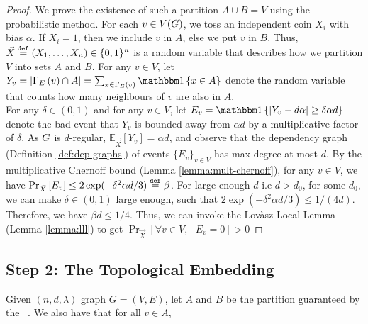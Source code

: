 \documentclass[11pt]{article}
\newcommand{\EnDeeLambda}{(n, d, \lambda)}
\newcommand{\EdgesShort}{E}
\newcommand{\Mean}[2]{\mathbb{E}_{#1}\left[#2\right]}
\newcommand{\PProb}[2]{\Pr_{#2}\left[#1 \right]}
\begin{document}
\begin{proof}We prove the existence of such a partition $A \cup B = V$ using the probabilistic method.
For each $v \in V(G)$, we toss an independent coin $X_i$ with bias $\alpha$.
If $X_i = 1$, then we include $v$ in $A$, else we put $v$ in $B$.
Thus, $\vec{X} \text{}\overset{\mathtt{def}}{=} (X_1, \dots, X_n) \in \{0,1\}^n$ is a random variable that describes how we partition $V$ into sets $A$ and $B$.
For any $v \in V$, let $Y_v = |\Neighbourhood{\EdgesShort}{v} \cap A| = \sum_{x \in \Neighbourhood{E}{v}} \Indicator{x \in A}$ denote the random variable that counts how many neighbours of $v$ are also in $A$.\\
For any $\delta \in (0,1)$ and for any $v \in V$, let $E_v = \Indicator{|Y_v - d\alpha | \geq \delta \alpha d}$ denote the bad event that $Y_v$ is bounded away from $\alpha d$ by a multiplicative factor of $\delta$.
As $G$ is $d$-regular, $\Mean{\vec{X}}{Y_v} = \alpha d$, and observe that the dependency graph (Definition \ref{def:dep-graphs}) of events $\{ E_v \}_{v \in V}$ has max-degree at most $d$.
By the multiplicative Chernoff bound (Lemma \ref{lemma:mult-chernoff}), for any $v \in V$, we have $\PProb{E_v}{\vec{X}} \leq 2\exp(-\delta^2\alpha d/3) \Def \beta$.
For large enough $d$ i.e $d > d_0$, for some $d_0$, we can make $\delta \in (0,1)$ large enough, such that $2\exp(-\delta^2\alpha d/3) \leq 1/(4d)$. Therefore, we have $\beta d \leq 1/4$.
Thus, we can invoke the Lov\`asz Local Lemma (Lemma \ref{lemma:lll}) to get $\PProb{\forall v \in V, \text{ } E_v = 0}{\vec{X}} > 0$

\end{proof}



\subsection{Step 2: The Topological Embedding}

Given $\EnDeeLambda$ graph $G=(V,E)$, let $A$ and $B$ be the partition guaranteed by the \ .
We also have that for all $v \in A$,  
\end{document}
